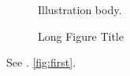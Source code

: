 \begin{figure}
\caption[Short Figure]{Long Figure Title}\label{fig:first}
Illustration body.
\end{figure}
See . \autoref{fig:first}.
